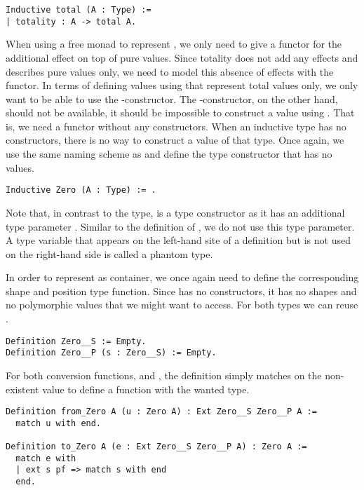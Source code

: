 \begin{verbatim}
Inductive total (A : Type) :=
| totality : A -> total A.
\end{verbatim}

When using a free monad to represent , we only need to give a functor for the additional effect on top of pure values.
Since totality does not add any effects and describes pure values only, we need to model this absence of effects with the functor.
In terms of defining values using  that represent total values only, we only want to be able to use the -constructor.
The -constructor, on the other hand, should not be available, it should be impossible to construct a value using .
That is, we need a functor without any constructors.
When an inductive type has no constructors, there is no way to construct a value of that type.
Once again, we use the same naming scheme as \citeauthor{swierstra2008data} and define the type constructor  that has no values.

\begin{verbatim}
Inductive Zero (A : Type) := .
\end{verbatim}

Note that, in contrast to the  type,  is a type constructor as it has an additional type parameter .
Similar to the definition of , we do not use this type parameter.
A type variable that appears on the left-hand site of a definition but is not used on the right-hand side is called a phantom type.

In order to represent  as container, we once again need to define the corresponding shape and position type function.
Since  has no constructors, it has no shapes and no polymorphic values that we might want to access.
For both types we can reuse .

\begin{verbatim}
Definition Zero__S := Empty.
Definition Zero__P (s : Zero__S) := Empty.
\end{verbatim}

For both conversion functions,  and , the definition simply matches on the non-existent value to define a function with the wanted type.

\begin{verbatim}
Definition from_Zero A (u : Zero A) : Ext Zero__S Zero__P A :=
  match u with end.

Definition to_Zero A (e : Ext Zero__S Zero__P A) : Zero A :=
  match e with
  | ext s pf => match s with end
  end.
\end{verbatim}

